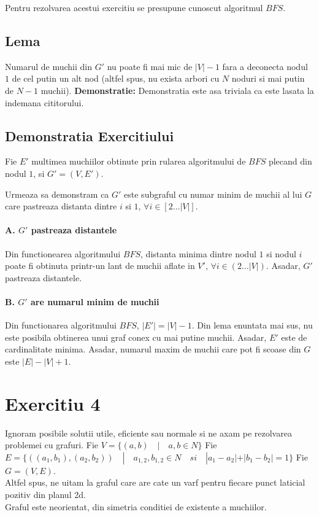 \documentclass{article}
\begin{document}
Pentru rezolvarea acestui exercitiu se presupune cunoscut algoritmul $BFS$.
\newline
\subsection*{Lema}
Numarul de muchii din $G'$ nu poate fi mai mic de $|V| - 1$ fara a deconecta nodul $1$ de cel putin un alt nod (altfel spus, nu exista arbori cu $N$ noduri si mai putin de $N - 1$ muchii).
\newline
\textbf{Demonstratie:} Demonstratia este asa triviala ca este lasata la indemana cititorului.

\subsection*{Demonstratia Exercitiului}

Fie $E'$ multimea muchiilor obtinute prin rularea algoritmului de $BFS$ plecand din nodul $1$, si $G' = (V, E')$.

Urmeaza sa demonstram ca $G'$ este subgraful cu numar minim de muchii al lui $G$ care pastreaza distanta dintre $i$ si $1$, $\forall i \in [2 \dots |V|]$.

\paragraph{A. $G'$ pastreaza distantele}
Din functionearea algoritmului $BFS$, distanta minima dintre nodul $1$ si nodul $i$ poate fi obtinuta printr-un lant de muchii aflate in $V'$, $\forall i \in (2 \dots |V|)$. Asadar, $G'$ pastreaza distantele.

\paragraph{B. $G'$ are numarul minim de muchii}
Din functionarea algoritmului $BFS$, $|E'| = |V| - 1$. Din lema enuntata mai sus, nu este posibila obtinerea unui graf conex cu mai putine muchii. Asadar, $E'$ este de cardinalitate minima.
\newline
\newline
Asadar, numarul maxim de muchii care pot fi scoase din $G$ este $|E| - |V| + 1$.

\section*{Exercitiu 4}

Ignoram posibile solutii utile, eficiente sau normale si ne axam pe rezolvarea problemei cu grafuri.
\newline
Fie $V = \{(a, b) \quad | \quad a, b \in N \}$
\newline
Fie $E = \{((a_1, b_1), (a_2, b_2)) \quad | \quad a_{1,2}, b_{1,2} \in N \quad si \quad |a_1-a_2|+|b_1-b_2|=1\}$
Fie $G = (V, E)$.\\
Altfel spus, ne uitam la graful care are cate un varf pentru fiecare punct laticial pozitiv din planul 2d.\\
Graful este neorientat, din simetria conditiei de existente a muchiilor.\\
\end{document}
